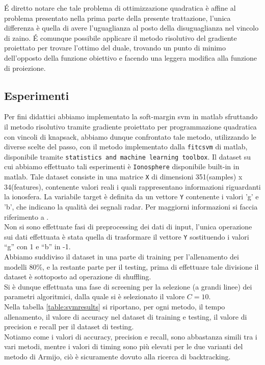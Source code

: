\documentclass[12pt]{extarticle}
\newcommand{\quotes}[1]{``#1''}
\begin{document}
\'E diretto notare che tale problema di ottimizzazione quadratica è affine al problema presentato nella prima parte della presente trattazione, l'unica differenza è quella di avere l'uguaglianza al posto della disuguaglianza nel vincolo di zaino.
\'E comunque possibile applicare il metodo risolutivo del gradiente proiettato per trovare l'ottimo del duale, trovando un punto di minimo dell'opposto della funzione obiettivo e facendo una leggera modifica alla funzione di proiezione.
\subsection{Esperimenti}
Per fini didattici abbiamo implementato la soft-margin svm in matlab sfruttando il metodo risolutivo tramite gradiente proiettato per programmazione quadratica con vincoli di knapsack, abbiamo dunque confrontato tale metodo, utilizzando le diverse scelte del passo, con il metodo implementato dalla \texttt{fitcsvm} di matlab, disponibile tramite \texttt{statistics and machine learning toolbox}.
Il dataset su cui abbiamo effettuato tali esperimenti è \texttt{Ionosphere} disponibile built-in in matlab. Tale dataset consiste in una matrice \texttt{X} di dimensioni 351(samples) x 34(features), contenente valori reali i quali rappresentano informazioni riguardanti la ionosfera. La variabile target è definita da un vettore \texttt{Y} contenente i valori 'g' e 'b', che indicano la qualità dei segnali radar. Per maggiorni informazioni si faccia riferimento a \cite{ionosphere_dataset}.\\
Non si sono effettuate fasi di preprocessing dei dati di input, l'unica operazione sui dati effettuata è stata quella di trasformare il vettore \texttt{Y} sostituendo i valori \quotes{g} con 1 e \quotes{b} in -1.\\
Abbiamo suddiviso il dataset in una parte di training per l'allenamento dei modelli $80\%$, e la restante parte per il testing, prima di effettuare tale divisione il dataset è sottoposto ad operazione di shuffling.\\
Si è dunque effettuata una fase di screening per la selezione (a grandi linee) dei parametri algoritmici, dalla quale si è selezionato il valore $C=10$.\\
Nella tabella \ref{table:svmresults} si riportano, per ogni metodo, il tempo allenamento, il valore di accuracy nel dataset di training e testing, il valore di precision e recall per il dataset di testing.\\
Notiamo come i valori di accuracy, precision e recall, sono abbastanza simili tra i vari metodi, mentre i valori di timing sono più elevati per le due varianti del metodo di Armijo, ciò è sicuramente dovuto alla ricerca di backtracking.\\
\end{document}
